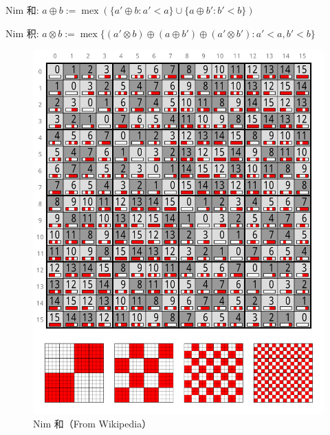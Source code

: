 Nim 和: \(a\oplus b:=\operatorname{mex}\left(\{a'\oplus b:a'<a\}\cup\{a\oplus b':b'<b\}\right)\)

Nim 积: \(a\otimes b:=\operatorname{mex}\{(a'\otimes b)\oplus(a\oplus b')\oplus(a'\otimes b'):a'<a,b'<b\}\)

\begin{figure}
    \label{img:nim-add}
    \includegraphics{img/Nimber addition.svg}
    \caption{Nim 和（From Wikipedia）}
\end{figure}

